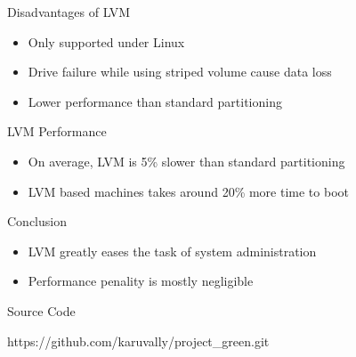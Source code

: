 \documentclass{beamer}
\begin{document}
\begin{frame}{Disadvantages of LVM}
    \begin{itemize}
        \item<2-> Only supported under Linux
        \item<3-> Drive failure while using striped volume cause data loss
        \item<5-> Lower performance than standard partitioning
    \end{itemize}
\end{frame}

\begin{frame}{LVM Performance}
    \begin{itemize}
        \item<2-> On average, LVM is 5\% slower than standard partitioning
        \item<3-> LVM based machines takes around 20\% more time to boot
    \end{itemize}
\end{frame}

\begin{frame}{Conclusion}
    \begin{itemize}
        \item<2-> LVM greatly eases the task of system administration
        \item<3-> Performance penality is mostly negligible
    \end{itemize}
\end{frame}

\begin{frame}{Source Code} 
    \begin{center}
        \large https://github.com/karuvally/project\_green.git
    \end{center}
\end{frame}
\end{document}
